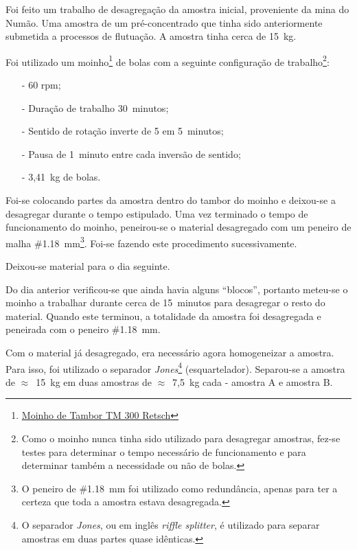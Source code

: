 \documentclass[a4paper]{tufte-handout}
\begin{document}

Foi feito um trabalho de desagregação da amostra inicial, proveniente da mina do Numão. 
Uma amostra de um pré-concentrado que tinha sido anteriormente submetida a processos de flutuação. 
A amostra tinha cerca de 15~kg.

Foi utilizado um moinho\footnote{\href{https://www.retsch.pt/pt/produtos/trituracao/moinhos-planetarios-e-de-bolas/tm-300/}{Moinho de Tambor TM 300 Retsch}} de bolas com a seguinte configuração de trabalho\footnote{Como o moinho nunca tinha sido utilizado para desagregar amostras, fez-se testes para determinar o tempo necessário de funcionamento e para determinar também a necessidade ou não de bolas.}:
\begin{itemize}
    \item[-] 60 rpm;
    \item[-] Duração de trabalho 30~minutos;
    \item[-] Sentido de rotação inverte de 5 em 5~minutos;
    \item[-] Pausa de 1~minuto entre cada inversão de sentido;
    \item[-] 3,41~kg de bolas.
\end{itemize}


Foi-se colocando partes da amostra dentro do tambor do moinho e deixou-se a desagregar durante o tempo estipulado. 
Uma vez terminado o tempo de funcionamento do moinho, peneirou-se o material desagregado com um peneiro de malha \#1.18~mm\footnote{O peneiro de \#1.18~mm foi utilizado como redundância, apenas para ter a certeza que toda a amostra estava desagregada.}.
Foi-se fazendo este procedimento sucessivamente.

Deixou-se material para o dia seguinte.

\hrulefill



Do dia anterior verificou-se que ainda havia alguns ``blocos'', portanto meteu-se o moinho a trabalhar durante cerca de 15~minutos para desagregar o resto do material.
Quando este terminou, a totalidade da amostra foi desagregada e peneirada com o peneiro \#1.18~mm.

Com o material já desagregado, era necessário agora homogeneizar a amostra.
Para isso, foi utilizado o separador \emph{Jones}\footnote{O separador \emph{Jones}, ou em inglês \emph{riffle splitter}, é utilizado para separar amostras em duas partes quase idênticas.} (esquartelador).
Separou-se a amostra de $\approx$~15~kg em duas amostras de $\approx$~7,5~kg cada - amostra A e amostra B.
\end{document}
